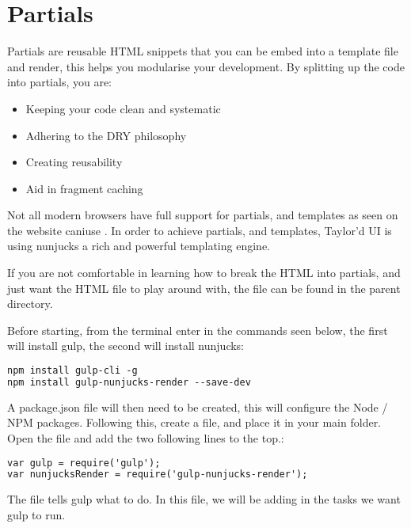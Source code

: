 \newpage
\chapter*{Partials}


Partials are reusable \gls{HTML} snippets that you can be embed into a template file and render, this helps you modularise your development. By splitting up the code into partials, you are:

\begin{itemize}
	\item Keeping your code clean and systematic
	\item Adhering to the \gls{DRY} philosophy
	\item Creating reusability
	\item Aid in fragment caching
\end{itemize}

Not all modern browsers have full support for partials, and templates as seen on the website caniuse \citep*{CANI17}. In order to achieve partials, and templates, Taylor'd UI is using nunjucks a rich and powerful templating engine. 

If you are not comfortable in learning how to break the \gls{HTML} into partials, and just want the \gls{HTML} file to play around with, the file  can be found in the parent directory.

Before starting, from the terminal enter in the commands seen below, the first will install gulp, the second will install nunjucks:

\begin{lstlisting}[language=HTML]
npm install gulp-cli -g
npm install gulp-nunjucks-render --save-dev
\end{lstlisting}

A package.json file will then need to be created, this will configure the Node / NPM packages. Following this, create a  file, and place it in your main folder. Open the file and add the two following lines to the top.:

\begin{lstlisting}[language=HTML]
var gulp = require('gulp');
var nunjucksRender = require('gulp-nunjucks-render');
\end{lstlisting}

The  file tells gulp what to do. In this file, we will be adding in the tasks we want gulp to run.


